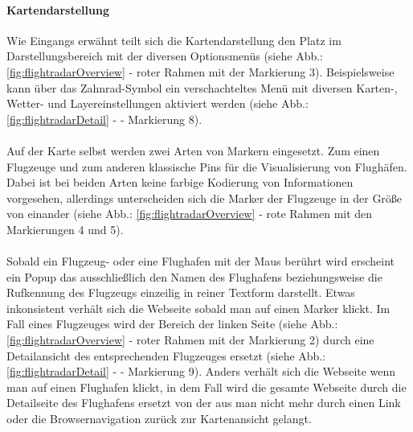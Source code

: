 \documentclass[../Bachelorarbeit.tex]{subfiles}
\begin{document}
\paragraph{Kartendarstellung}
\label{flightradarMap}
Wie Eingangs erwähnt teilt sich die Kartendarstellung den Platz im Darstellungsbereich mit der diversen Optionsmenüs (siehe Abb.: \ref{fig:flightradarOverview} - roter Rahmen mit der Markierung 3). 
Beispielsweise kann über das Zahnrad-Symbol ein verschachteltes Menü mit diversen Karten-, Wetter- und Layereinstellungen aktiviert werden (siehe Abb.: \ref{fig:flightradarDetail} -  - Markierung 8).\\
\\
Auf der Karte selbst werden zwei Arten von Markern eingesetzt. 
Zum einen Flugzeuge und zum anderen klassische Pins für die Visualisierung von Flughäfen.
Dabei ist bei beiden Arten keine farbige Kodierung von Informationen vorgesehen, allerdings unterscheiden sich die Marker der Flugzeuge in der Größe von einander (siehe Abb.: \ref{fig:flightradarOverview} - rote Rahmen mit den Markierungen 4 und 5).\\
\\
Sobald ein Flugzeug- oder eine Flughafen mit der Maus berührt wird erscheint ein Popup das ausschließlich den Namen des Flughafens beziehungsweise die Rufkennung des Flugzeugs einzeilig in reiner Textform darstellt.
Etwas inkonsistent verhält sich die Webseite sobald man auf einen Marker klickt.
Im Fall eines Flugzeuges wird der Bereich der linken Seite (siehe Abb.: \ref{fig:flightradarOverview} - roter Rahmen mit der Markierung 2) durch eine Detailansicht des entsprechenden Flugzeuges ersetzt (siehe Abb.: \ref{fig:flightradarDetail} -  - Markierung 9).
Anders verhält sich die Webseite wenn man auf einen Flughafen klickt, in dem Fall wird die gesamte Webseite durch die Detailseite des Flughafens ersetzt von der aus man nicht mehr durch einen Link oder die Browsernavigation zurück zur Kartenansicht gelangt.
\end{document}
